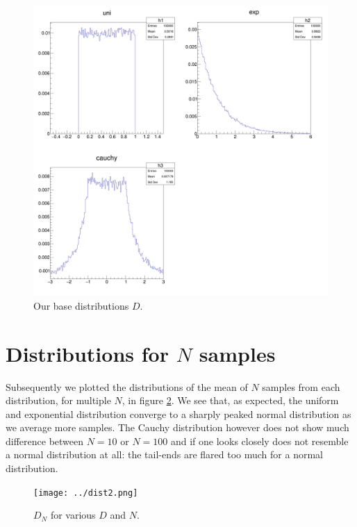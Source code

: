 \documentclass[notitlepage, 12pt, a4paper, twoside, titlepage]{article}
\begin{document}
\begin{figure}[h!]
  \includegraphics[width=\linewidth]{../distributions.png}
  \caption{Our base distributions $D$.}
  \label{fig:dist}
\end{figure}

\section{Distributions for $N$ samples}
Subsequently we plotted the distributions of the mean of $N$ samples from each distribution, for multiple $N$, in figure \ref{fig:dist2}. We see that, as expected, the uniform and exponential distribution converge to a sharply peaked normal distribution as we average more samples.
The Cauchy distribution however does not show much difference between $N = 10$ or $N = 100$ and if one looks closely does not resemble a normal distribution at all: the tail-ends are flared too much for a normal distribution.

\begin{figure}[h!]
  \texttt{[image: ../dist2.png]}
  \caption{$D_N$ for various $D$ and $N$.}
  \label{fig:dist2}
\end{figure}
\end{document}
